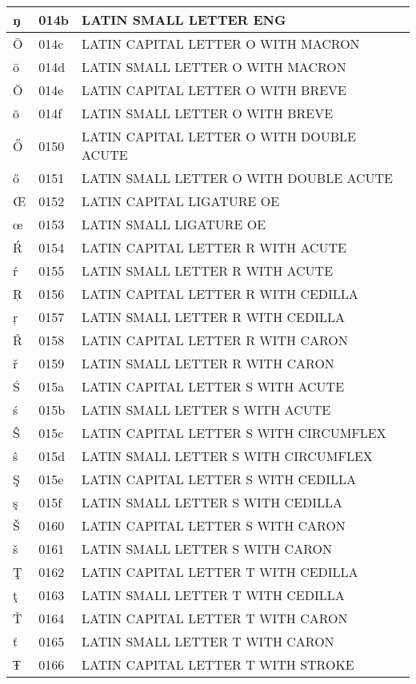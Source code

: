 \documentclass[12pt,letterpaper,openany]{book}
\begin{document}
\begin{center}
\begin{supertabular}{|m{0.25in}|m{0.5in}|m{4in}|}
			ŋ & 014b & LATIN SMALL LETTER ENG\\\hline
			Ō & 014c & LATIN CAPITAL LETTER O WITH MACRON\\\hline
			ō & 014d & LATIN SMALL LETTER O WITH MACRON\\\hline
			Ŏ & 014e & LATIN CAPITAL LETTER O WITH BREVE\\\hline
			ŏ & 014f & LATIN SMALL LETTER O WITH BREVE\\\hline
			Ő & 0150 & LATIN CAPITAL LETTER O WITH DOUBLE ACUTE\\\hline
			ő & 0151 & LATIN SMALL LETTER O WITH DOUBLE ACUTE\\\hline
			Œ & 0152 & LATIN CAPITAL LIGATURE OE\\\hline
			œ & 0153 & LATIN SMALL LIGATURE OE\\\hline
			Ŕ & 0154 & LATIN CAPITAL LETTER R WITH ACUTE\\\hline
			ŕ & 0155 & LATIN SMALL LETTER R WITH ACUTE\\\hline
			Ŗ & 0156 & LATIN CAPITAL LETTER R WITH CEDILLA\\\hline
			ŗ & 0157 & LATIN SMALL LETTER R WITH CEDILLA\\\hline
			Ř & 0158 & LATIN CAPITAL LETTER R WITH CARON\\\hline
			ř & 0159 & LATIN SMALL LETTER R WITH CARON\\\hline
			Ś & 015a & LATIN CAPITAL LETTER S WITH ACUTE\\\hline
			ś & 015b & LATIN SMALL LETTER S WITH ACUTE\\\hline
			Ŝ & 015c & LATIN CAPITAL LETTER S WITH CIRCUMFLEX\\\hline
			ŝ & 015d & LATIN SMALL LETTER S WITH CIRCUMFLEX\\\hline
			Ş & 015e & LATIN CAPITAL LETTER S WITH CEDILLA\\\hline
			ş & 015f & LATIN SMALL LETTER S WITH CEDILLA\\\hline
			Š & 0160 & LATIN CAPITAL LETTER S WITH CARON\\\hline
			š & 0161 & LATIN SMALL LETTER S WITH CARON\\\hline
			Ţ & 0162 & LATIN CAPITAL LETTER T WITH CEDILLA\\\hline
			ţ & 0163 & LATIN SMALL LETTER T WITH CEDILLA\\\hline
			Ť & 0164 & LATIN CAPITAL LETTER T WITH CARON\\\hline
			ť & 0165 & LATIN SMALL LETTER T WITH CARON\\\hline
			Ŧ & 0166 & LATIN CAPITAL LETTER T WITH STROKE\\\hline

\end{supertabular}
\end{center}
\end{document}

